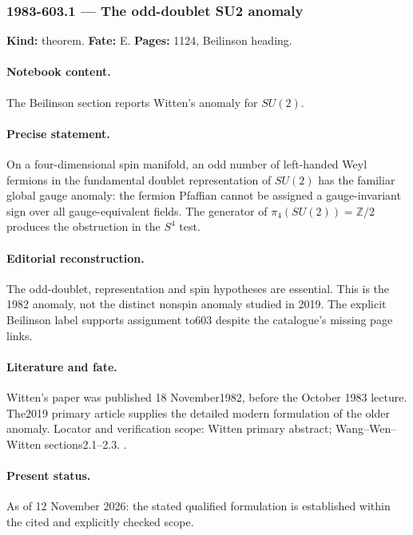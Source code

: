 \subsubsection{1983-603.1 --- The odd-doublet SU2 anomaly}

\label{item:1983-603.1}

\noindent\textbf{Kind:} theorem. \textbf{Fate:} E. \textbf{Pages:} 1124, Beilinson heading.\par

\paragraph{Notebook content.} The Beilinson section reports Witten's anomaly for \(SU(2)\).

\paragraph{Precise statement.} On a four-dimensional spin manifold, an odd number of left-handed Weyl fermions in the fundamental doublet representation of \(SU(2)\) has the familiar global gauge anomaly: the fermion Pfaffian cannot be assigned a gauge-invariant sign over all gauge-equivalent fields. The generator of \(\pi_4(SU(2))=\mathbb Z/2\) produces the obstruction in the \(S^4\) test.

\paragraph{Editorial reconstruction.} The odd-doublet, representation and spin hypotheses are essential. This is the 1982 anomaly, not the distinct nonspin anomaly studied in 2019. The explicit Beilinson label supports assignment to603 despite the catalogue's missing page links.

\paragraph{Literature and fate.} Witten's paper was published 18 November1982, before the October 1983 lecture. The2019 primary article supplies the detailed modern formulation of the older anomaly. Locator and verification scope: Witten primary abstract; Wang--Wen--Witten sections2.1--2.3. \cite{witten1982anomaly,wangwenwitten2019new}.

\paragraph{Present status.} As of 12 November 2026: the stated qualified formulation is established within the cited and explicitly checked scope.

